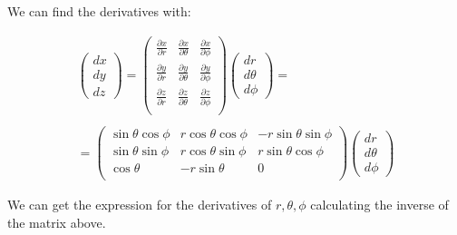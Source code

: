 We can find the derivatives with:

\begin{equation}
  \begin{array}{c}
    \left(\begin{matrix}
      dx\\
      dy\\
      dz
    \end{matrix}\right) =
    \left(\begin{matrix}
      \frac{\partial x}{\partial r} & \frac{\partial x}{\partial \theta} & \frac{\partial x}{\partial \phi} \\
      \frac{\partial y}{\partial r} & \frac{\partial y}{\partial \theta} & \frac{\partial y}{\partial \phi} \\
      \frac{\partial z}{\partial r} & \frac{\partial z}{\partial \theta} & \frac{\partial z}{\partial \phi} \\
    \end{matrix}\right)
    \left(\begin{matrix}
      dr\\
      d\theta\\
      d\phi
    \end{matrix}
    \right) =
    \\

    \\
    = \left(\begin{matrix}
      \sin{\theta}\cos{\phi} & r\cos{\theta}\cos{\phi} & -r\sin{\theta}\sin{\phi}  \\
      \sin{\theta}\sin{\phi} & r\cos{\theta}\sin{\phi} & r\sin{\theta}\cos{\phi}   \\
      \cos{\theta}           & -r\sin{\theta}          &           0               \\
    \end{matrix}\right)
    \left(\begin{matrix}
      dr\\
      d\theta\\
      d\phi
    \end{matrix}
    \right)
  \end{array}
\end{equation}


We can get the expression for the derivatives of $r,\theta,\phi$ calculating the inverse of the matrix above.

